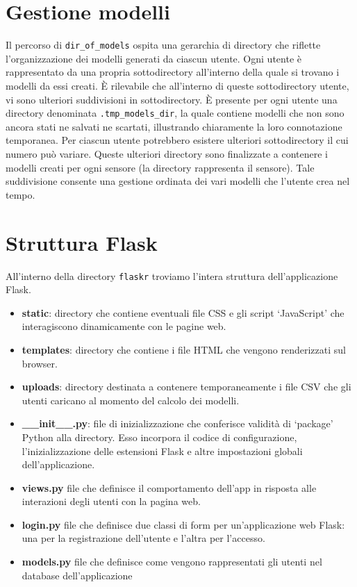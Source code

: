 \documentclass{rapportECL}
\begin{document}
\section{Gestione modelli}
Il percorso di \texttt{dir\_of\_models} ospita una gerarchia di directory che riflette l'organizzazione dei modelli generati da ciascun utente. 
Ogni utente è rappresentato da una propria sottodirectory all'interno della quale si trovano i modelli da essi creati. 
È rilevabile che all'interno di queste sottodirectory utente, vi sono ulteriori suddivisioni in sottodirectory. È presente per ogni utente
una directory denominata \texttt{.tmp\_models\_dir}, la quale contiene modelli che non sono ancora stati ne salvati ne scartati, illustrando chiaramente
la loro connotazione temporanea. Per ciascun utente potrebbero esistere ulteriori sottodirectory il cui numero può variare.
Queste ulteriori directory sono finalizzate a contenere i modelli creati per ogni sensore (la directory rappresenta il sensore).
Tale suddivisione consente una gestione ordinata dei vari modelli che l'utente crea nel tempo.

\section{Struttura Flask}
All'interno della directory \texttt{flaskr} troviamo l'intera struttura dell'applicazione Flask.
\begin{itemize}
  \item \textbf{static}: directory che contiene eventuali file CSS e gli script `JavaScript' che interagiscono dinamicamente con le pagine web.
  \item \textbf{templates}: directory che contiene i file HTML che vengono renderizzati sul browser.
  \item \textbf{uploads}: directory destinata a contenere temporaneamente i file CSV che gli utenti caricano al momento del calcolo dei modelli.
  \item \textbf{\_\_init\_\_.py}: file di inizializzazione che conferisce validità di `package' Python alla directory. 
  Esso incorpora il codice di configurazione, l'inizializzazione delle estensioni Flask e altre impostazioni globali dell'applicazione.
  \item \textbf{views.py} file che definisce il comportamento dell'app in risposta alle interazioni degli utenti con la pagina web.
  \item \textbf{login.py} file che definisce due classi di form per un'applicazione web Flask: una per la registrazione dell'utente e l'altra per l'accesso.
  \item \textbf{models.py} file che definisce come vengono rappresentati gli utenti nel database dell'applicazione
\end{itemize}
\end{document}
